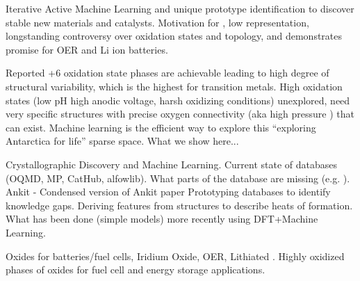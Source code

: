 Iterative Active Machine Learning and unique prototype identification to discover stable new materials and catalysts.
Motivation for , low representation, longstanding controversy over oxidation states and topology, and demonstrates promise for OER and Li ion batteries.

Reported +6 oxidation state phases are achievable leading to high degree of structural variability, which is the highest for transition metals.
High oxidation states (low pH high anodic voltage, harsh oxidizing conditions) unexplored, need very specific structures with precise oxygen connectivity (aka high pressure ) that can exist.
Machine learning is the efficient way to explore this “exploring Antarctica for life” sparse space.
What we show here...


Crystallographic Discovery and Machine Learning.
Current state of databases (OQMD, MP, CatHub, alfowlib).
What parts of the database are missing (e.g. ).
Ankit - Condensed version of Ankit paper
Prototyping databases to identify knowledge gaps.
Deriving features from structures to describe heats of formation.
What has been done (simple models) more recently using DFT+Machine Learning.


Oxides for batteries/fuel cells, Iridium Oxide, OER, Lithiated .
Highly oxidized phases of oxides for fuel cell and energy storage applications.
